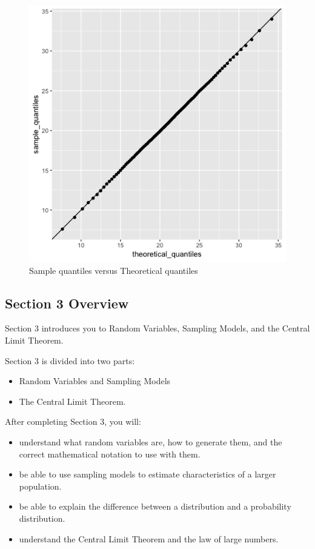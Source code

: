 \documentclass[
]{article}
\providecommand{\tightlist}{%
  \setlength{\itemsep}{0pt}\setlength{\parskip}{0pt}}
\begin{document}
\begin{figure}
\centering
\includegraphics{images/sample_theoretical_imageD.png}
\caption{Sample quantiles versus Theoretical quantiles}
\end{figure}

\newpage

\hypertarget{section-3-overview}{%
\subsection{Section 3 Overview}\label{section-3-overview}}

Section 3 introduces you to Random Variables, Sampling Models, and the
Central Limit Theorem.

Section 3 is divided into two parts:

\begin{itemize}
\tightlist
\item
  Random Variables and Sampling Models
\item
  The Central Limit Theorem.
\end{itemize}

After completing Section 3, you will:

\begin{itemize}
\tightlist
\item
  understand what random variables are, how to generate them, and the
  correct mathematical notation to use with them.
\item
  be able to use sampling models to estimate characteristics of a larger
  population.
\item
  be able to explain the difference between a distribution and a
  probability distribution.
\item
  understand the Central Limit Theorem and the law of large numbers.
\end{itemize}
\end{document}
